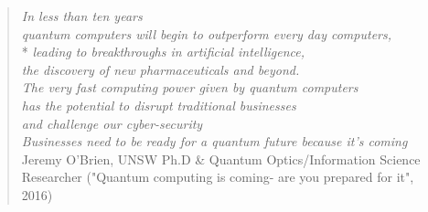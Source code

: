 \phantom{.}
\vspace{4in}

\begin{singlespace}
\begin{quote}
  \textit{In less than ten years}\\
  \textit{quantum computers will begin to outperform every day computers,}\\*
  \textit{leading to breakthroughs in artificial intelligence,}\\
  \textit{the discovery of new pharmaceuticals and beyond.} \\
  \textit{The very fast computing power given by quantum computers}\\
  \textit{has the potential to disrupt traditional businesses} \\
  \textit{and challenge our cyber-security}\\
  \textit{Businesses need to be ready for a quantum future because it's coming} \newline \newline
  \hfill{Jeremy O'Brien, UNSW Ph.D \& Quantum Optics/Information Science Researcher ("Quantum computing is coming- are you prepared for it", 2016)}
\end{quote}
\end{singlespace}

%
